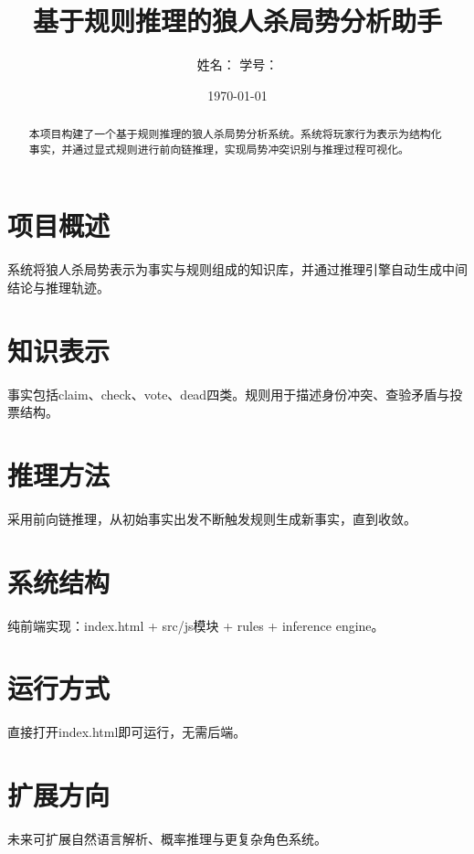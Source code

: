 \documentclass{ctexart}
\title{基于规则推理的狼人杀局势分析助手}
\author{姓名：\underline{\hspace{4cm}} 学号：\underline{\hspace{4cm}}}
\date{\today}
\begin{document}
\maketitle

\begin{abstract}
本项目构建了一个基于规则推理的狼人杀局势分析系统。系统将玩家行为表示为结构化事实，并通过显式规则进行前向链推理，实现局势冲突识别与推理过程可视化。
\end{abstract}

\section{项目概述}
系统将狼人杀局势表示为事实与规则组成的知识库，并通过推理引擎自动生成中间结论与推理轨迹。

\section{知识表示}
事实包括claim、check、vote、dead四类。规则用于描述身份冲突、查验矛盾与投票结构。

\section{推理方法}
采用前向链推理，从初始事实出发不断触发规则生成新事实，直到收敛。

\section{系统结构}
纯前端实现：index.html + src/js模块 + rules + inference engine。

\section{运行方式}
直接打开index.html即可运行，无需后端。

\section{扩展方向}
未来可扩展自然语言解析、概率推理与更复杂角色系统。
\end{document}

